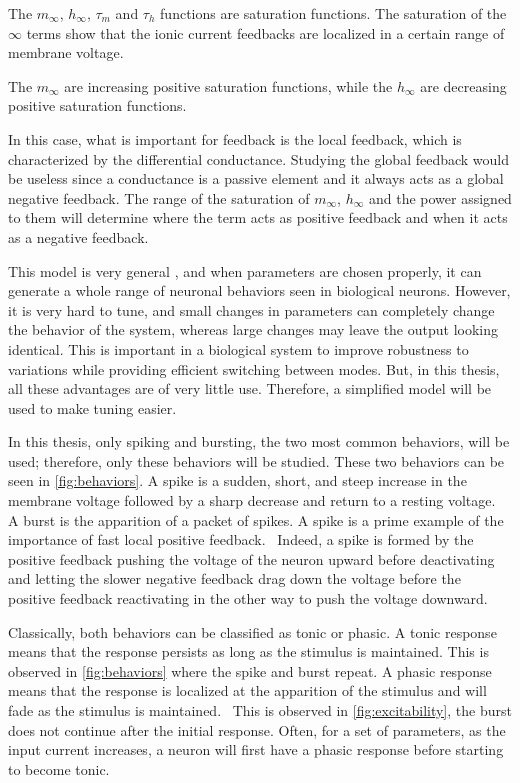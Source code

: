 The $m_\infty$, $h_\infty$, $\tau_m$ and $\tau_h$ functions are saturation functions. 
The saturation of the $\infty$ terms show that the ionic current feedbacks are localized in a certain range of membrane voltage.

The $m_\infty$ are increasing positive saturation functions, while the $h_\infty$ are decreasing positive saturation functions.

In this case, what is important for feedback is the local feedback, which is characterized by the differential conductance.
Studying the global feedback would be useless since a conductance is a passive element and it always acts as a global negative feedback. 
The range of the saturation of $m_\infty$, $h_\infty$ and the power assigned to them will determine where the term acts as positive feedback and when it acts as a negative feedback.

This model is very general , and when parameters are chosen properly, it can generate a whole range of neuronal behaviors seen in biological neurons.
However, it is very hard to tune, and small changes in parameters can completely change the behavior of the system, whereas large changes may leave the output looking identical.
This is important in a biological system to improve robustness to variations while providing efficient switching between modes.
But, in this thesis, all these advantages are of very little use.
Therefore, a simplified model will be used to make tuning easier.

In this thesis, only spiking and bursting, the two most common behaviors, will be used; therefore, only these behaviors will be studied. These two behaviors can be seen in \cref{fig:behaviors}.
A spike is a sudden, short, and steep increase in the membrane voltage followed by a sharp decrease and return to a resting voltage. 
A burst is the apparition of a packet of spikes.
A spike is a prime example of the importance of fast local positive feedback. 
Indeed, a spike is formed by the positive feedback pushing the voltage of the neuron upward before deactivating and letting the slower negative feedback drag down the voltage before the positive feedback reactivating in the other way to push the voltage downward.

Classically, both behaviors can be classified as tonic or phasic.
A tonic response means that the response persists as long as the stimulus is maintained.
This is observed in \cref{fig:behaviors} where the spike and burst repeat.
A phasic response means that the response is localized at the apparition of the stimulus and will fade as the stimulus is maintained. 
This is observed in \cref{fig:excitability}, the burst does not continue after the initial response.
Often, for a set of parameters, as the input current increases, a neuron will first have a phasic response before starting to become tonic.

